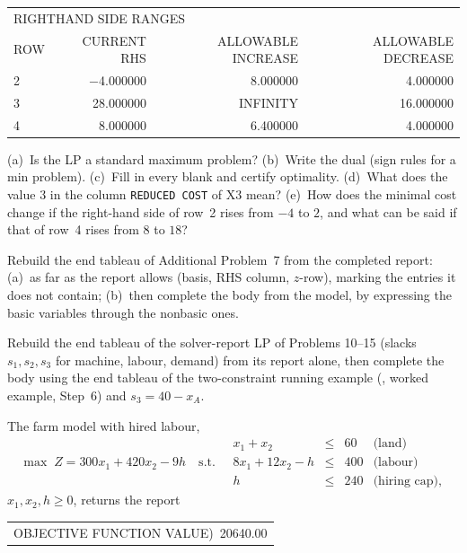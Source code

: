 \begin{problems}
\begin{center}
        \medskip
        \begin{tabular}{lrrr}
        \multicolumn{4}{l}{RIGHTHAND SIDE RANGES}\\
        ROW & CURRENT RHS & ALLOWABLE INCREASE & ALLOWABLE DECREASE\\
        2 & $-$4.000000 & 8.000000 & 4.000000\\
        3 & 28.000000 & INFINITY & 16.000000\\
        4 & 8.000000 & 6.400000 & 4.000000\\
        \end{tabular}
        \end{center}
        (a)~Is the LP a standard maximum problem? (b)~Write the dual (sign
        rules for a min problem). (c)~Fill in every blank and certify
        optimality. (d)~What does the value $3$ in the column
        \texttt{REDUCED COST} of X3 mean? (e)~How does the minimal cost
        change if the right-hand side of row~2 rises from $-4$ to $2$, and
        what can be said if that of row~4 rises from $8$ to $18$?
  \item Rebuild the end tableau of Additional Problem~7 from the completed
        report: (a)~as far as the report allows (basis, RHS column,
        $z$-row), marking the entries it does not contain; (b)~then
        complete the body from the model, by expressing the basic
        variables through the nonbasic ones.
  \item Rebuild the end tableau of the solver-report LP of Problems
        10--15 (slacks $s_{1},s_{2},s_{3}$ for machine, labour, demand)
        from its report alone, then complete the body using the end
        tableau of the two-constraint running example (, worked
        example, Step~6) and $s_{3}=40-x_{A}$.
  \item The farm model with hired labour,
        \[
          \max\; Z=300x_{1}+420x_{2}-9h
          \quad\text{s.t.}\quad
          \begin{array}{rcll}
            x_{1}+x_{2} &\le& 60 & \text{(land)}\\
            8x_{1}+12x_{2}-h &\le& 400 & \text{(labour)}\\
            h &\le& 240 & \text{(hiring cap)},
          \end{array}
        \]
        $x_{1},x_{2},h\ge 0$, returns the report
        \begin{center}\footnotesize\ttfamily
        \begin{tabular}{lrr}
        \multicolumn{3}{l}{OBJECTIVE FUNCTION VALUE\quad 1)\ 20640.00}\\[3pt]

\end{tabular}
\end{center}
\end{problems}
